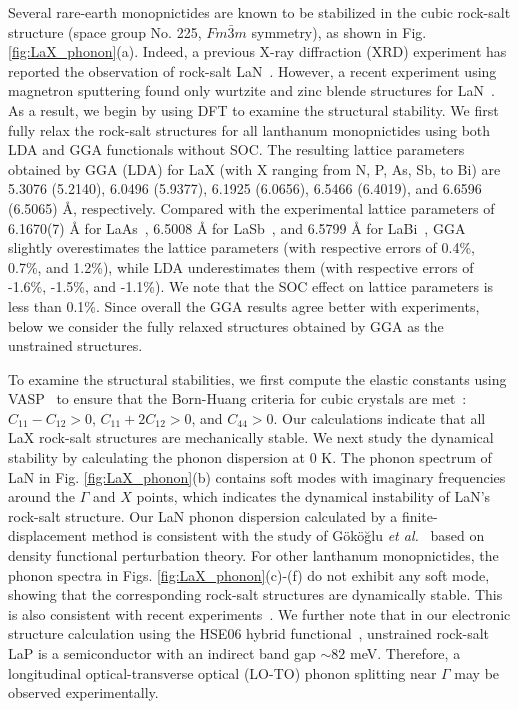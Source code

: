 	

	Several rare-earth monopnictides are known to be stabilized in the cubic rock-salt structure (space group No. 225, $Fm\bar{3}m$ symmetry), as shown in Fig. \ref{fig:LaX_phonon}(a). Indeed, a previous X-ray diffraction (XRD) experiment has reported the observation of rock-salt LaN~\cite{LaN_pressure_schneider2012}. However, a recent experiment using magnetron sputtering found only wurtzite and zinc blende structures for LaN~\cite{LaN_synthesis}. As a result, we begin by using DFT to examine the structural stability. We first fully relax the rock-salt structures for all lanthanum monopnictides using both LDA and GGA functionals without SOC. The resulting lattice parameters obtained by GGA (LDA) for LaX (with X ranging from N, P, As, Sb, to Bi) are 5.3076 (5.2140), 6.0496 (5.9377), 6.1925 (6.0656), 6.5466 (6.4019), and 6.6596 (6.5065) \r{A}, respectively. Compared with the experimental lattice parameters of 6.1670(7) \r{A} for LaAs~\cite{LaAs_mBJ_XMR_yang2017}, 6.5008 \r{A} for LaSb~\cite{LaSb_LaBi_XMR_PNAS}, and 6.5799 \r{A} for LaBi~\cite{LaSb_LaBi_XMR_PNAS}, GGA slightly overestimates the lattice parameters (with respective errors of 0.4\%, 0.7\%, and 1.2\%), while LDA underestimates them (with respective errors of -1.6\%, -1.5\%, and -1.1\%). We note that the SOC effect on lattice parameters is less than 0.1\%. Since overall the GGA results agree better with experiments, below we consider the fully relaxed structures obtained by GGA as the unstrained structures. 
	
	To examine the structural stabilities, we first compute the elastic constants using VASP~\cite{ELASTIC_VASP} to ensure that the Born-Huang criteria for cubic crystals are met~\cite{BORN-HUANG}: $C_{11}-C_{12} > 0$,  $C_{11}+2C_{12} > 0$, and $C_{44} > 0$. Our calculations indicate that all LaX rock-salt structures are mechanically stable. We next study the dynamical stability by calculating the phonon dispersion at 0 K. The phonon spectrum of LaN in Fig. \ref{fig:LaX_phonon}(b) contains soft modes with imaginary frequencies around the $\Gamma$ and $X$ points, which indicates the dynamical instability of LaN's rock-salt structure. Our LaN phonon dispersion calculated by a finite-displacement method is consistent with the study of G\"ok\"o\u{g}lu \textit{et al.}~\cite{LaN_phonon} based on density functional perturbation theory. For other lanthanum monopnictides, the phonon spectra in Figs. \ref{fig:LaX_phonon}(c)-(f) do not exhibit any soft mode, showing that the corresponding rock-salt structures are dynamically stable. This is also consistent with recent experiments~\cite{LaSb_ARPES_zeng2016, LaBi_LaSb_topo_ARPES_niu2016, LaX_arpes_nummy2018}. 
    We further note that in our electronic structure calculation using the HSE06 hybrid functional~\cite{HSE06}, unstrained rock-salt LaP is a semiconductor with an indirect band gap $\sim 82$ meV. Therefore, a longitudinal optical-transverse optical (LO-TO) phonon splitting near $\Gamma$ may be observed experimentally.


